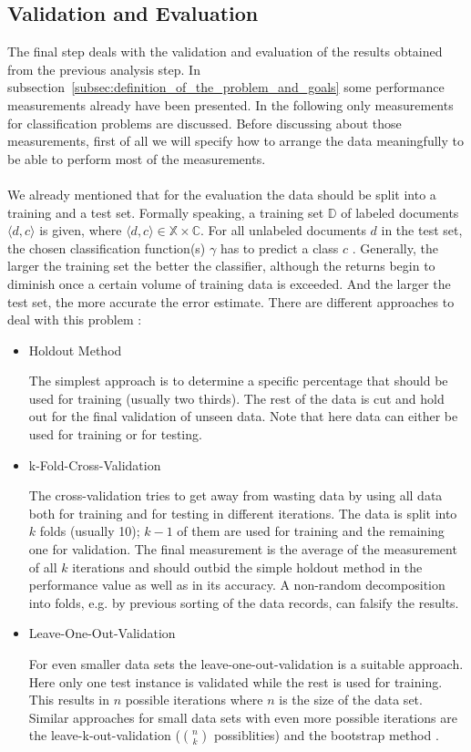 \documentclass[article,type=msc,colorback,accentcolor=tud7b]{tudthesis}
\begin{document}
  \subsection{Validation and Evaluation}
  \label{subsec:validation_and_evaluation}
    The final step deals with the validation and evaluation of the results obtained from the previous analysis step. In subsection~\ref{subsec:definition_of_the_problem_and_goals} some performance measurements already have been presented. In the following only measurements for classification problems are discussed. Before discussing about those measurements, first of all we will specify how to arrange the data meaningfully to be able to perform most of the measurements. \\\\
    We already mentioned that for the evaluation the data should be split into a training and a test set. Formally speaking, a training set $\mathbb{D}$ of labeled documents $\langle d,c\rangle$ is given, where $\langle d,c\rangle\in\mathbb{X}\times\mathbb{C}$. For all unlabeled documents $d$ in the test set, the chosen classification function(s) $\gamma$ has to predict a class $c$ \autocite[Chapter~13.1]{Manning2008}. Generally, the larger the training set the better the classifier, although the returns begin to diminish once a certain volume of training data is exceeded. And the larger the test set, the more accurate the error estimate. There are different approaches to deal with this problem \autocite[Chapter~5]{Witten2005}:
    \begin{itemize}
      \item Holdout Method
      
        The simplest approach is to determine a specific percentage that should be used for training (usually two thirds). The rest of the data is cut and hold out for the final validation of unseen data. Note that here data can either be used for training or for testing.
      \item k-Fold-Cross-Validation
      
        The cross-validation tries to get away from wasting data by using all data both for training and for testing in different iterations. The data is split into $k$ folds (usually 10); $k-1$ of them are used for training and the remaining one for validation. The final measurement is the average of the measurement of all $k$ iterations and should outbid the simple holdout method in the performance value as well as in its accuracy. A non-random decomposition into folds, e.g. by previous sorting of the data records, can falsify the results.
      \item Leave-One-Out-Validation
      
        For even smaller data sets the leave-one-out-validation is a suitable approach. Here only one test instance is validated while the rest is used for training. This results in $n$ possible iterations where $n$ is the size of the data set. Similar approaches for small data sets with even more possible iterations are the leave-k-out-validation ($\binom{n}{k}$ possiblities) and the bootstrap method \autocite[Chapter~4]{Arlot2010}.
    \end{itemize}
\end{document}
